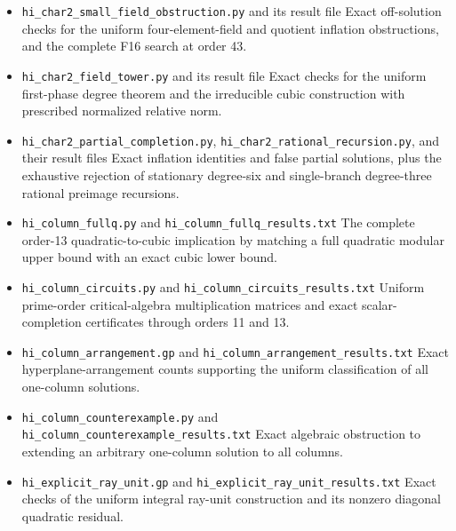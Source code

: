 \documentclass[11pt,reqno]{amsart}
\theoremstyle{plain}
\begin{document}
\begin{itemize}
Certified conjugate-prime and Frobenius relations, and exact norm
compatibility across the saved order-9 and order-27 branches.
\item \texttt{hi\_\allowbreak char2\_\allowbreak small\_\allowbreak field\_\allowbreak obstruction.py} and its result file
Exact off-solution checks for the uniform four-element-field and
quotient inflation obstructions, and the complete F16 search at order 43.
\item \texttt{hi\_\allowbreak char2\_\allowbreak field\_\allowbreak tower.py} and its result file
Exact checks for the uniform first-phase degree theorem and the
irreducible cubic construction with prescribed normalized relative norm.
\item \texttt{hi\_\allowbreak char2\_\allowbreak partial\_\allowbreak completion.py}, \texttt{hi\_\allowbreak char2\_\allowbreak rational\_\allowbreak recursion.py},
and their result files
Exact inflation identities and false partial solutions, plus the
exhaustive rejection of stationary degree-six and single-branch
degree-three rational preimage recursions.
\item \texttt{hi\_\allowbreak column\_\allowbreak fullq.py} and \texttt{hi\_\allowbreak column\_\allowbreak fullq\_\allowbreak results.txt}
The complete order-13 quadratic-to-cubic implication by matching a
full quadratic modular upper bound with an exact cubic lower bound.
\item \texttt{hi\_\allowbreak column\_\allowbreak circuits.py} and \texttt{hi\_\allowbreak column\_\allowbreak circuits\_\allowbreak results.txt}
Uniform prime-order critical-algebra multiplication matrices and exact
scalar-completion certificates through orders 11 and 13.
\item \texttt{hi\_\allowbreak column\_\allowbreak arrangement.gp} and \texttt{hi\_\allowbreak column\_\allowbreak arrangement\_\allowbreak results.txt}
Exact hyperplane-arrangement counts supporting the uniform classification of all one-column solutions.
\item \texttt{hi\_\allowbreak column\_\allowbreak counterexample.py} and \texttt{hi\_\allowbreak column\_\allowbreak counterexample\_\allowbreak results.txt}
Exact algebraic obstruction to extending an arbitrary one-column solution to all columns.
\item \texttt{hi\_\allowbreak explicit\_\allowbreak ray\_\allowbreak unit.gp} and \texttt{hi\_\allowbreak explicit\_\allowbreak ray\_\allowbreak unit\_\allowbreak results.txt}
Exact checks of the uniform integral ray-unit construction and its nonzero diagonal quadratic residual.

\end{itemize}
\end{document}
